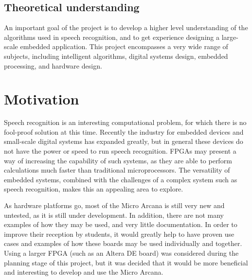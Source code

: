 	\subsection{Theoretical understanding} %
	\label{sec:theoretical_understanding}
		An important goal of the project is to develop a higher level understanding of the algorithms used in speech recognition, and to get experience designing a large-scale embedded application.  This project encompasses a very wide range of subjects, including intelligent algorithms, digital systems design, embedded processing, and hardware design.



\section{Motivation} %
\label{sec:motivation}
	Speech recognition is an interesting computational problem, for which there is no fool-proof solution at this time.  Recently the industry for embedded devices and small-scale digital systems has expanded greatly, but in general these devices do not have the power or speed to run speech recognition.  FPGAs may present a way of increasing the capability of such systems, as they are able to perform calculations much faster than traditional microprocessors.  The versatility of embedded systems, combined with the challenges of a complex system such as speech recognition, makes this an appealing area to explore.

	As hardware platforms go, most of the Micro Arcana is still very new and untested, as it is still under development.  In addition, there are not many examples of how they may be used, and very little documentation.  In order to improve their reception by students, it would greatly help to have proven use cases and examples of how these boards may be used individually and together.  Using a larger FPGA (such as an Altera DE board) was considered during the planning stage of this project, but it was decided that it would be more beneficial and interesting to develop and use the Micro Arcana.



